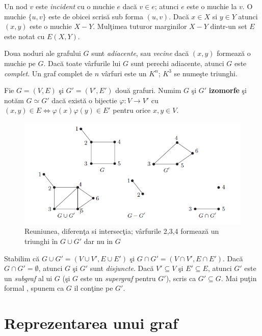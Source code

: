 \documentclass[11pt,a4paper]{report}
\begin{document}
	Un nod $v$ este \textit{incident} cu o muchie $e$ dac\u a $v\in e$; atunci $e$ este o muchie la $v$. O muchie $\{u,v\}$ este de obicei scris\u a sub forma $(u,v)$. Dac\u a $x\in X$ si $y\in Y$ atunci $(x,y)$ este o muchie $X-Y$. Mul\c timea tuturor marginilor $X-Y$ dintr-un set $E$ este notat cu $E(X,Y)$.
	
	Doua noduri ale grafului $G$ sunt \textit{adiacente}, sau \textit{vecine} dac\u a $(x,y)$ formeaz\u a o muchie pe $G$. Dac\u a toate v\^ arfurile lui $G$ sunt perechi adiacente, atunci $G$ este \textit{complet}. Un graf complet de $n$ v\^ arfuri este un $K^n$; $K^3$ se nume\c ste triunghi.
	
	Fie $G=(V,E)$ \c si $G'=(V',E')$ dou\u a grafuri. Numim $G$  \c si  $G'$  \textbf{izomorfe} \c si not\u am $G\simeq G'$ dac\u a exist\u a o bijectie $\varphi :V\rightarrow V'$ cu $(x,y)\in E  \Leftrightarrow \varphi (x) \varphi (y) \in E'$ pentru orice $x,y\in V$.
	
	\begin{figure}[!hbt]
		\centering
		\includegraphics[width=12.2cm]{Figura2.png}
		\caption{Reuniunea, diferen\c ta si intersec\c tia; v\^ arfurile 2,3,4 \centering \newline formeaz\u a un triunghi \^ in $G\cup G'$ dar nu in $G$}
	\end{figure}
	
	
	Stabilim c\u a $G\cup G'=(V\cup V',E\cup E')$ \c si $G\cap G'=(V\cap V',E\cap E')$. Dac\u a $G\cap G'=\emptyset$, atunci $G$ \c si $G'$ sunt \textit{disjuncte}. Dac\u a $V'\subseteq V$ \c si $E'\subseteq E$, atunci $G'$ este un \textit{subgraf} al ui $G$ (\c si $G$ este un \textit{supergraf} pentru $G'$), scris ca $G'\subseteq G$. Mai pu\c tin formal , spunem ca $G$ il con\c tine pe $G'$. 
    
    \section{Reprezentarea unui graf}
   
\end{document}
